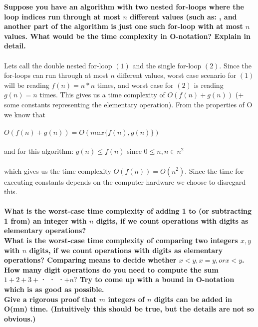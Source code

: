 \documentclass[12pt,oneside,reqno]{amsart}
\begin{document}
\textbf{Suppose you have an algorithm with two nested for-loops where the loop indices run through at most $n$ different values (such as: , and another part of the algorithm is just one such for-loop with at most $n$ values. What would be the time complexity in O-notation? Explain in detail.}\\\\%
Lets call the double nested for-loop $(1)$ and the single for-loop $(2)$. Since the for-loops can run through at most $n$ different values, worst case scenario for $(1)$ will be reading $f(n)=n*n$ times, and worst case for $(2)$ is reading $g(n)=n$ times. This gives us a time complexity of $O(f(n)+g(n))$ (+ some constants representing the elementary operation). From the properties of O we know that\\\\ 
$O(f(n)+g(n))=O(max\{f(n), g(n)\})$\\\\
and for this algorithm: $g(n) \leq f(n)$ since $0 \leq n, n\in n^2$ \\\\
which gives us the time complexity $O(f(n))=O(n^2)$. Since the time for executing constants depends on the computer hardware we choose to disregard this.\\\\
\textbf{What is the worst-case time complexity of adding 1 to (or subtracting 1 from) an integer with $n$ digits, if we count operations with digits as elementary operations?}
\\

\textbf{What is the worst-case time complexity of comparing two integers $x, y$ with $n$ digits, if we count operations with digits as elementary operations? Comparing means to decide whether $x < y, x = y, or x < y$.}
\\

\textbf{How many digit operations do you need to compute the sum $1+2+3+$· · ·$+n?$ Try to come up with a bound in O-notation which is as good as possible.}
\\

\textbf{Give a rigorous proof that $m$ integers of $n$ digits can be added in O(mn) time. (Intuitively this should be true, but the details are not so obvious.)}
\end{document}

